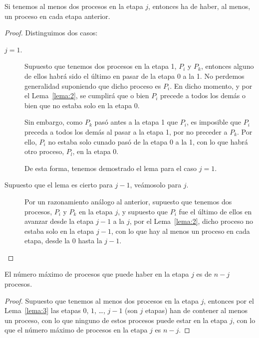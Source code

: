 \begin{lema}\label{lema:3}
    Si tenemos al menos dos procesos en la etapa $j$, entonces ha de haber, al menos, un proceso en cada etapa anterior.
    \begin{proof}
        Distinguimos dos casos:
        \begin{description}
            \item [$j=1$.] Supuesto que tenemos dos procesos en la etapa 1, $P_i$ y $P_k$, entonces alguno de ellos habrá sido el último en pasar de la etapa 0 a la 1. No perdemos generalidad suponiendo que dicho proceso es $P_i$. En dicho momento, y por el Lema~\ref{lema:2}, se cumplirá que o bien $P_i$ precede a todos los demás o bien que no estaba solo en la etapa 0.

                Sin embargo, como $P_k$ pasó antes a la etapa 1 que $P_i$, es imposible que $P_i$ preceda a todos los demás al pasar a la etapa 1, por no preceder a $P_k$. Por ello, $P_i$ no estaba solo cunado pasó de la etapa 0 a la 1, con lo que habrá otro proceso, $P_l$, en la etapa 0.

                De esta forma, tenemos demostrado el lema para el caso $j=1$.
            \item [Supuesto que el lema es cierto para $j-1$, veámosolo para $j$.] Por un razonamiento análogo al anterior, supuesto que tenemos dos procesos, $P_i$ y $P_k$ en la etapa $j$, y supuesto que $P_i$ fue el último de ellos en avanzar desde la etapa $j-1$ a la $j$, por el Lema~\ref{lema:2}, dicho proceso no estaba solo en la etapa $j-1$, con lo que hay al menos un proceso en cada etapa, desde la 0 hasta la $j-1$.
        \end{description}
    \end{proof}
\end{lema}

\begin{lema}\label{lema:4}
    El número máximo de procesos que puede haber en la etapa $j$ es de $n-j$ procesos.
    \begin{proof}
        Supuesto que tenemos al menos dos procesos en la etapa $j$, entonces por el Lema~\ref{lema:3} las etapas $0$, $1$, \ldots, $j-1$ (son $j$ etapas) han de contener al menos un proceso, con lo que ninguno de estos procesos puede estar en la etapa $j$, con lo que el número máximo de procesos en la etapa $j$ es $n-j$.
    \end{proof}
\end{lema}

